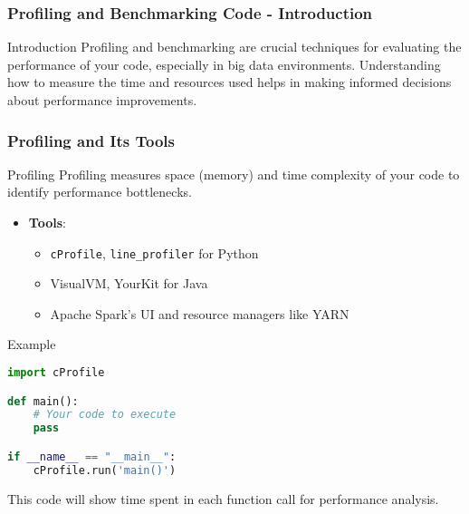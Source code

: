 \documentclass[aspectratio=169]{beamer}
\begin{document}
\begin{frame}[fragile]
    \frametitle{Profiling and Benchmarking Code - Introduction}
    \begin{block}{Introduction}
        Profiling and benchmarking are crucial techniques for evaluating the performance of your code, especially in big data environments. Understanding how to measure the time and resources used helps in making informed decisions about performance improvements.
    \end{block}
\end{frame}

\begin{frame}[fragile]
    \frametitle{Profiling and Its Tools}
    \begin{block}{Profiling}
        Profiling measures space (memory) and time complexity of your code to identify performance bottlenecks.
    \end{block}
    \begin{itemize}
        \item \textbf{Tools}:
        \begin{itemize}
            \item \texttt{cProfile}, \texttt{line\_profiler} for Python
            \item VisualVM, YourKit for Java
            \item Apache Spark's UI and resource managers like YARN
        \end{itemize}
    \end{itemize}
    \begin{block}{Example}
        \begin{lstlisting}[language=Python]
import cProfile

def main():
    # Your code to execute
    pass

if __name__ == "__main__":
    cProfile.run('main()')
        \end{lstlisting}
        This code will show time spent in each function call for performance analysis.
    \end{block}
\end{frame}
\end{document}
